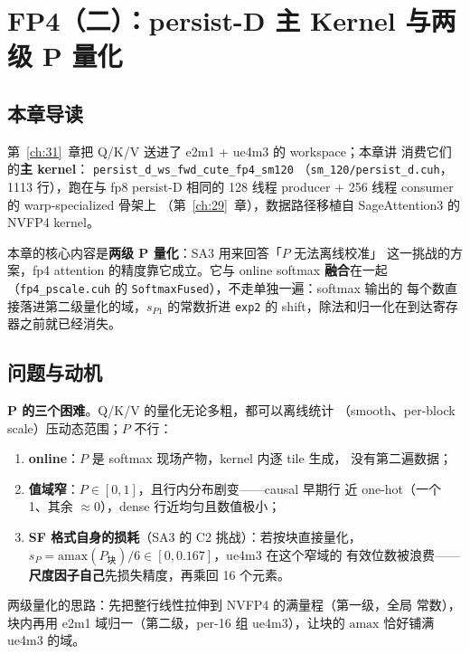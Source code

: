 \chapter{FP4（二）：persist-D 主 Kernel 与两级 P 量化}\label{ch:32}

\section{本章导读}

第~\ref{ch:31}~章把 Q/K/V 送进了 e2m1 + ue4m3 的 workspace；本章讲
消费它们的\textbf{主 kernel}：
\texttt{persist\_d\_ws\_fwd\_}\allowbreak\texttt{cute\_fp4\_sm120}
（\texttt{sm\_120/persist\_d.cuh}，1113 行），跑在与 fp8 persist-D 相同的
128 线程 producer + 256 线程 consumer 的 warp-specialized 骨架上
（第~\ref{ch:29}~章），数据路径移植自 SageAttention3 的 NVFP4 kernel。

本章的核心内容是\textbf{两级 P 量化}：SA3 用来回答「$P$ 无法离线校准」
这一挑战的方案，fp4 attention 的精度靠它成立。它与 online softmax
\textbf{融合}在一起（\texttt{fp4\_pscale.cuh} 的
\texttt{SoftmaxFused}），不走单独一遍：softmax 输出的
每个数直接落进第二级量化的域，$s_{P1}$ 的常数折进 \texttt{exp2} 的
shift，除法和归一化在到达寄存器之前就已经消失。

\section{问题与动机}

\textbf{P 的三个困难}。Q/K/V 的量化无论多粗，都可以离线统计
（smooth、per-block scale）压动态范围；$P$ 不行：
\begin{enumerate}[itemsep=0pt,topsep=2pt]
  \item \textbf{online}：$P$ 是 softmax 现场产物，kernel 内逐 tile 生成，
        没有第二遍数据；
  \item \textbf{值域窄}：$P\in[0,1]$，且行内分布剧变——causal 早期行
        近 one-hot（一个 1、其余 $\approx0$），dense 行近均匀且数值极小；
  \item \textbf{SF 格式自身的损耗}（SA3 的 C2 挑战）：若按块直接量化，
        $s_P=\mathrm{amax}(P_{\text{块}})/6\in[0,0.167]$，ue4m3 在这个窄域的
        有效位数被浪费——\textbf{尺度因子自己}先损失精度，再乘回 16
        个元素。
\end{enumerate}
两级量化的思路：先把整行线性拉伸到 NVFP4 的满量程（第一级，全局
常数），块内再用 e2m1 域归一（第二级，per-16 组 ue4m3），让块的
$\mathrm{amax}$ 恰好铺满 ue4m3 的域。

